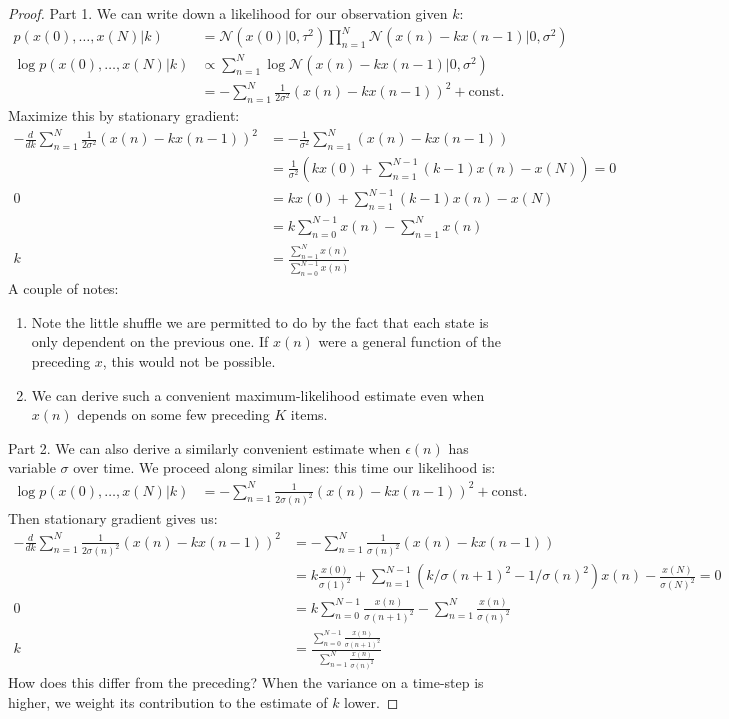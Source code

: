 \documentclass{article}
\begin{document}
\begin{proof}
Part 1. We can write down a likelihood for our observation given $k$:
\begin{align}
p(x(0), \dots, x(N) | k) &= \mathcal{N}(x(0) | 0, \tau^2) \prod_{n = 1}^N \mathcal{N}(x(n) - k x(n - 1) | 0, \sigma^2) \\
\log p(x(0), \dots, x(N) | k) &\propto \sum_{n = 1}^N \log \mathcal{N}(x(n) - k x(n - 1) | 0, \sigma^2) \\
&= -\sum_{n = 1}^N \frac{1}{2\sigma^2} (x(n) - k x(n - 1))^2 + \text{const.}
\end{align}
Maximize this by stationary gradient:
\begin{align}
-\frac{d}{dk} \sum_{n = 1}^N \frac{1}{2\sigma^2} (x(n) - k x(n - 1))^2 &= -\frac{1}{\sigma^2} \sum_{n = 1}^N (x(n) - k x(n - 1)) \\
&= \frac{1}{\sigma^2} \left(k x(0) + \sum_{n = 1}^{N - 1} (k - 1)x(n) - x(N) \right) = 0\\
0 &= k x(0) + \sum_{n = 1}^{N - 1} (k - 1)x(n) - x(N) \\
&= k \sum_{n = 0}^{N - 1} x(n) - \sum_{n = 1}^N x(n) \\
k &= \frac{\sum_{n = 1}^N x(n)}{\sum_{n = 0}^{N - 1} x(n)}
\end{align}
A couple of notes:
\begin{enumerate}
	\item Note the little shuffle we are permitted to do by the fact that each state is only dependent on the previous one. If $x(n)$ were a general function of the preceding $x$, this would not be possible.
	
	\item We can derive such a convenient maximum-likelihood estimate even when $x(n)$ depends on some few preceding $K$ items.
\end{enumerate}

Part 2. We can also derive a similarly convenient estimate when $\epsilon(n)$ has variable $\sigma$ over time. We proceed along similar lines: this time our likelihood is:
\begin{align}
\log p(x(0), \dots, x(N) | k) &= -\sum_{n = 1}^N \frac{1}{2\sigma(n)^2} (x(n) - k x(n - 1))^2 + \text{const.}
\end{align}
Then stationary gradient gives us:
\begin{align}
-\frac{d}{dk} \sum_{n = 1}^N \frac{1}{2\sigma(n)^2} (x(n) - k x(n - 1))^2 &= -\sum_{n = 1}^N \frac{1}{\sigma(n)^2} (x(n) - k x(n - 1)) \\
&= k \frac{x(0)}{\sigma(1)^2} + \sum_{n = 1}^{N - 1} \left(k/\sigma(n + 1)^2 - 1/\sigma(n)^2\right)x(n) - \frac{x(N)}{\sigma(N)^2} = 0\\
0 &= k \sum_{n = 0}^{N - 1} \frac{x(n)}{\sigma(n + 1)^2} - \sum_{n = 1}^N \frac{x(n)}{\sigma(n)^2} \\
k &= \frac{\sum_{n = 0}^{N - 1} \frac{x(n)}{\sigma(n + 1)^2}}{\sum_{n = 1}^N \frac{x(n)}{\sigma(n)^2}}
\end{align}
How does this differ from the preceding? When the variance on a time-step is higher, we weight its contribution to the estimate of $k$ lower.
\end{proof}
\end{document}
